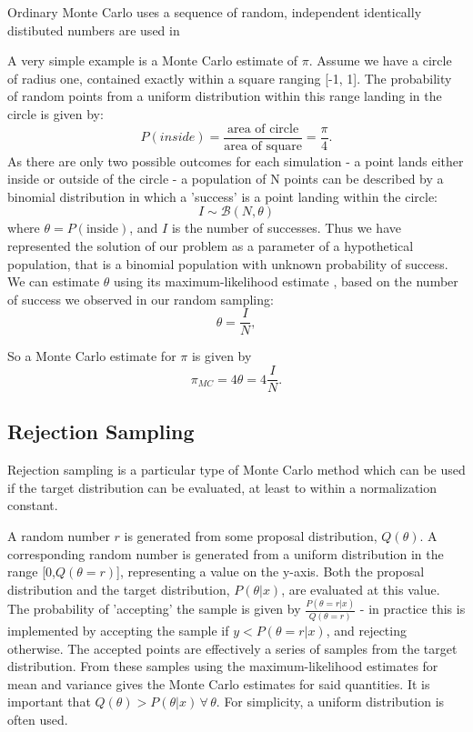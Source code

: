 \documentclass[a4paper,11pt,twoside]{article}
\begin{document}
Ordinary Monte Carlo uses a sequence of random, independent identically distibuted
numbers are used in

A very simple example is a Monte Carlo estimate of $\pi$. Assume we have a
circle of radius one, contained exactly within a square ranging [-1, 1]. The
probability of random points from a uniform distribution within this range
landing in the circle is given by:
\begin{equation}
	P(inside) = \frac{\text{area of circle}}{\text{area of square}} =
	\frac{\pi}{4}.
\end{equation}
As there are only two possible outcomes for each simulation - a point lands
either inside or outside of the circle - a  population of N points can be
described by a binomial distribution in which a 'success' is a point landing within
the circle:
\begin{equation}
	I \sim \mathcal{B}(N, \theta)
\end{equation}
where $\theta = P(\text{inside})$, and $I$ is the number of successes.
Thus we have represented the solution of our problem as a parameter of a
hypothetical population, that is a binomial population with unknown probability
of success.
We can estimate $\theta$ using its maximum-likelihood estimate \cite{som}, based
on the number of success we observed in our random sampling:
\begin{equation}
	\theta = \frac{I}{N},
\end{equation}

So a Monte Carlo estimate for $\pi$ is given by
\begin{equation}
	\pi_{MC} = 4 \theta = 4 \frac{I}{N}.
\end{equation}

\subsection{Rejection Sampling}
Rejection sampling is a particular type of Monte Carlo method which can be used
if the target distribution can be evaluated, at least to within a normalization
constant. 

A random number $r$ is generated from some proposal distribution, $Q(\theta)$. A
corresponding random number is generated from a uniform distribution in the
range [0,$Q(\theta = r)$], representing a value on the y-axis. Both the
proposal distribution and the target distribution, $P(\theta|x)$, are
evaluated at this value. The probability of 'accepting' the sample is given by
$\frac{P(\theta = r|x)}{Q(\theta = r)}$ - in practice this is implemented by accepting the
sample if $y < P(\theta = r|x)$, and rejecting otherwise. The accepted points are
effectively a series of samples from the target distribution. From these
samples using the maximum-likelihood estimates for mean and variance gives the
Monte Carlo estimates for said quantities. It is important that $Q(\theta) >
P(\theta|x) \, \forall \, \theta$. For simplicity, a uniform distribution is often used.
\end{document}

